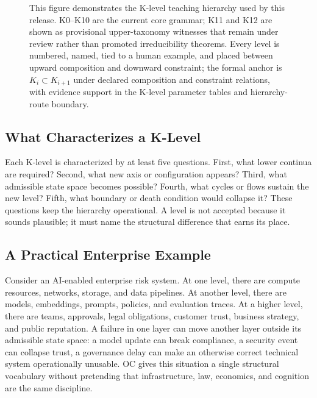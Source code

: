 \begin{figure}[!htbp]
{}
\caption{This figure demonstrates the K-level teaching hierarchy used by this release. K0--K10 are the current core grammar; K11 and K12 are shown as provisional upper-taxonomy witnesses that remain under review rather than promoted irreducibility theorems. Every level is numbered, named, tied to a human example, and placed between upward composition and downward constraint; the formal anchor is \(K_i \subset K_{i+1}\) under declared composition and constraint relations, with evidence support in the K-level parameter tables and hierarchy-route boundary.}
\label{fig:r012-k0-k12-hierarchy}
\end{figure}

\subsection{What Characterizes a K-Level}

Each K-level is characterized by at least five questions. First, what lower
continua are required? Second, what new axis or configuration appears? Third,
what admissible state space becomes possible? Fourth, what cycles or flows
sustain the new level? Fifth, what boundary or death condition would collapse
it? These questions keep the hierarchy operational. A level is not accepted
because it sounds plausible; it must name the structural difference that earns
its place.

\subsection{A Practical Enterprise Example}

Consider an AI-enabled enterprise risk system. At one level, there are compute
resources, networks, storage, and data pipelines. At another level, there are
models, embeddings, prompts, policies, and evaluation traces. At a higher
level, there are teams, approvals, legal obligations, customer trust, business
strategy, and public reputation. A failure in one layer can move another layer
outside its admissible state space: a model update can break compliance, a
security event can collapse trust, a governance delay can make an otherwise
correct technical system operationally unusable. OC gives this situation a
single structural vocabulary without pretending that infrastructure, law,
economics, and cognition are the same discipline.


